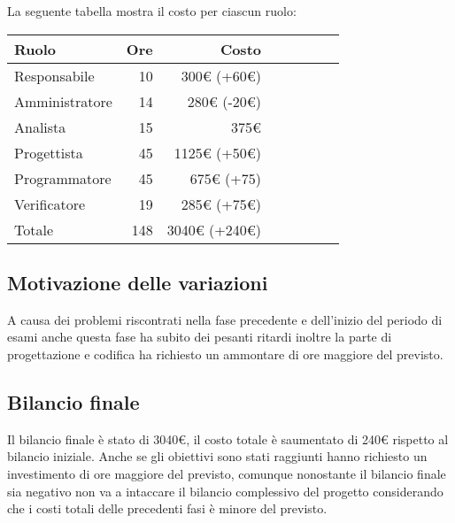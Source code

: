 La seguente tabella mostra il costo per ciascun ruolo:
\begin{table}[ht]
    \begin{tabularx}{\linewidth}{X|rrrrrrr}
    \rowcolor{gray!30}Ruolo & Ore & Costo \\
    \hline
    Responsabile                            & 10  & 300€ (+60€)\\
    \rowcolor{gray!10}Amministratore        & 14  & 280€ (-20€) \\
    Analista                                & 15  & 375€ \\
    \rowcolor{gray!10}Progettista           & 45  & 1125€ (+50€) \\
    Programmatore                           & 45  & 675€ (+75)\\
    \rowcolor{gray!10}Verificatore          & 19  & 285€ (+75€) \\
    \hline Totale                           & 148 & 3040€ (+240€) \\ 
    \end{tabularx}
\end{table}

\subsection{Motivazione delle variazioni}

A causa dei problemi riscontrati nella fase precedente e dell'inizio del periodo di esami anche questa fase ha subito dei pesanti ritardi inoltre la parte di progettazione e codifica ha richiesto un ammontare di ore maggiore del previsto.

\subsection{Bilancio finale}

Il bilancio finale è stato di 3040€, il costo totale è saumentato di 240€ rispetto al bilancio iniziale. Anche se gli obiettivi sono stati raggiunti hanno richiesto un investimento di ore maggiore del previsto, comunque nonostante il bilancio finale sia negativo non va a intaccare il bilancio complessivo del progetto considerando che i costi totali delle precedenti fasi è minore del previsto.